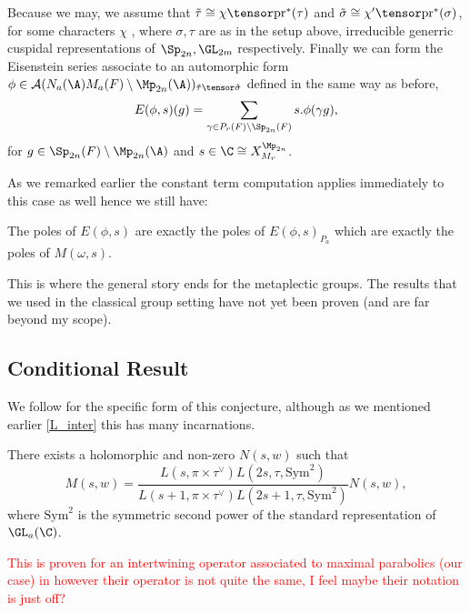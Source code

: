     Because we may,  we assume that \(\tilde{\tau} \cong \chi\tensor \mathrm{pr}^*(\tau)\) and \(\tilde{\sigma} \cong \chi'\tensor \mathrm{pr}^*(\sigma)\), for some characters \(\chi\) , where \(\sigma, \tau\) are as in the setup above, irreducible generric cuspidal representations of \(\Sp_{2n}, \GL_{2m}\) respectively.
    Finally we can form the Eisenstein series associate to an automorphic form \(\phi\in \mathcal{A}(N_a(\A)M_a(F)\setminus \Mp_{2n}(\A) )_{\tilde{\tau}\tensor \tilde\sigma}\) defined in the same way as before,
    \[E(\phi, s)(g) = \sum_{\gamma\in P_r(F) \setminus \Sp_{2n}(F)} s.\phi(\gamma g),\]
    for \(g\in \Sp_{2n}(F) \setminus \Mp_{2n}(\A)\) and \(s\in \C \cong X^{\Mp_{2n}}_{M_r}\).

    As we remarked earlier the constant term computation applies immediately to this case as well hence we still have:
    \begin{Lemma}
            The poles of \(E(\phi, s)\) are exactly the poles of \(E(\phi,s)_{P_a}\) which are exactly the poles of \(M(\omega, s)\).
    \end{Lemma}
    This is where the general story ends for the metaplectic groups. The results that we used in the classical group setting have not yet been proven (and are far beyond my scope). 

    \subsection{Conditional Result}
     We follow \cite[Assumption 6.1]{wuThetaCorrespondenceSimple2024wuThetaCorrespondenceSimple2024} for the specific form of this conjecture, although as we mentioned earlier \ref{L_inter} this has many incarnations. 
     \begin{Conj}\label{conjecture_1}
        There exists a holomorphic and non-zero \(N(s,w)\) such that 
     \[M(s, w) = \frac{L(s, \pi\times \tau^{\vee}) L(2s, \tau, \mathrm{Sym}^2)}{L(s+1, \pi\times \tau^\vee)L(2s+1, \tau, \mathrm{Sym}^2)}N(s,w),\]
     where \(\mathrm{Sym}^2\) is the symmetric second power of the standard representation of \(\GL_a(\C)\).
     \end{Conj}
     \textcolor{red}{This is proven for an intertwining operator associated to maximal parabolics (our case) in \cite[Thm. 7.10]{gaoLanglandsShahidiFunctionsBrylinskiDeligne2018} however their operator is not quite the same, I feel maybe their notation is just off?}

